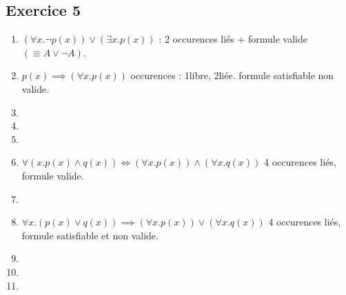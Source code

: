 \documentclass[a4paper]{article}
\begin{document}
\begin{spacing}{1.25}
\subsection*{Exercice 5}
\begin{enumerate}
  \item $(\forall x . \lnot p(x)) \lor (\exists x . p(x))$ : 2 occurences liés + formule valide $(\equiv A \lor \lnot A)$.\\
  \item $p(x) \implies (\forall x . p(x))$ occurences : 1\ier libre, 2\ieme liée. formule satisfiable non valide.\\
  \item
  \item
  \item
  \item $\forall (x . p(x) \land q(x)) \iff (\forall x . p(x)) \land (\forall x.q(x))$ 4 occurences liés, formule valide.
  \item
  \item$\forall x . (p(x)\lor q(x)) \implies (\forall x .p(x)) \lor (\forall x . q(x))$ 4 occurences liés, formule satisfiable et non valide.
  \item
  \item
  \item
\end{enumerate}
\end{spacing}
\end{document}
